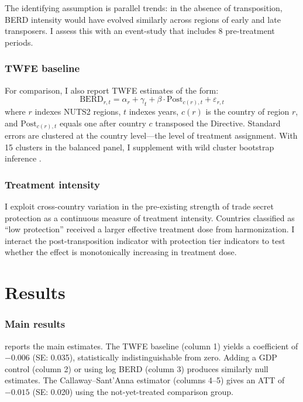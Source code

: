 \documentclass[12pt]{article}
\begin{document}
The identifying assumption is parallel trends: in the absence of transposition, BERD intensity would have evolved similarly across regions of early and late transposers. I assess this with an event-study that includes 8 pre-treatment periods.

\subsubsection*{TWFE baseline} For comparison, I also report TWFE estimates of the form:
\begin{equation}
\text{BERD}_{r,t} = \alpha_r + \gamma_t + \beta \cdot \text{Post}_{c(r),t} + \varepsilon_{r,t}
\label{eq:twfe}
\end{equation}
where $r$ indexes NUTS2 regions, $t$ indexes years, $c(r)$ is the country of region $r$, and $\text{Post}_{c(r),t}$ equals one after country $c$ transposed the Directive. Standard errors are clustered at the country level---the level of treatment assignment. With 15 clusters in the balanced panel, I supplement with wild cluster bootstrap inference \citep{CameronGelbachMiller2008}.

\subsubsection*{Treatment intensity} I exploit cross-country variation in the pre-existing strength of trade secret protection as a continuous measure of treatment intensity. Countries classified as ``low protection'' received a larger effective treatment dose from harmonization. I interact the post-transposition indicator with protection tier indicators to test whether the effect is monotonically increasing in treatment dose.


\section{Results}
\label{sec:results}

\subsubsection*{Main results}  reports the main estimates. The TWFE baseline (column 1) yields a coefficient of $-0.006$ (SE: 0.035), statistically indistinguishable from zero. Adding a GDP control (column 2) or using log BERD (column 3) produces similarly null estimates. The Callaway--Sant'Anna estimator (columns 4--5) gives an ATT of $-0.015$ (SE: 0.020) using the not-yet-treated comparison group.
\end{document}

